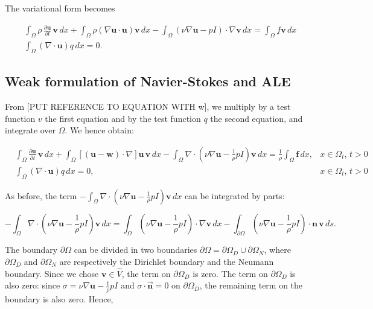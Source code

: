 \documentclass[11pt,a4paper,titlepage]{report}
\begin{document}
The variational form becomes

\begin{align}
& \int_{\Omega} \rho \, \frac{\partial \mathbf{u}}{\partial t} \, \mathbf{v} \, dx + \int_{\Omega} \rho (\nabla \mathbf{u} \cdot \mathbf{u})\mathbf{v} \, dx - \int_{\Omega} (\nu \nabla \mathbf{u} - pI) \cdot \nabla \mathbf{v} \, dx = \int_{\Omega} f\mathbf{v} \, dx \\
& \int_{\Omega} (\nabla \cdot \mathbf{u}) q \, dx = 0.
\end{align}


\subsection{Weak formulation of Navier-Stokes and ALE}


From [PUT REFERENCE TO EQUATION WITH w], we multiply by a test function $v$ the first equation and by the test function $q$ the second equation, and integrate over $\Omega$. We hence obtain:


\[
\begin{aligned}
& \int_{\Omega} \frac{\partial \mathbf{u}}{\partial t} \, \mathbf{v} \, dx 
+ \int_{\Omega} [(\mathbf{u - w}) \cdot \nabla] \mathbf{u} \, \mathbf{v} \, dx
- \int_{\Omega} \nabla \cdot (\nu \nabla \mathbf{u} -  \frac{1}{\rho}  pI)\mathbf{v} \, dx
=  \frac{1}{\rho} \int_{\Omega} \mathbf{f} \, dx,  & x \in \Omega_t, \, t>0 \\
& \int_{\Omega}  (\nabla \cdot \mathbf{u}) q \, dx = 0 , & x \in \Omega_t, \, t>0
\end{aligned}
\]


As before, the term $- \int_{\Omega} \nabla \cdot (\nu \nabla \mathbf{u} -   \frac{1}{\rho}  pI)\mathbf{v} \, dx$ can be integrated by parts:

\[
- \int_{\Omega} \nabla \cdot (\nu \nabla \mathbf{u} -  \frac{1}{\rho} pI)\mathbf{v} \, dx =  \int_{\Omega} (\nu \nabla \mathbf{u} -  \frac{1}{\rho}  pI) \cdot \nabla \mathbf{v} \, dx - \int_{\partial \Omega} (\nu \nabla \mathbf{u} -  \frac{1}{\rho}  pI) \cdot \mathbf{n} \, \mathbf{v} \, ds.
\]

The boundary $\partial \Omega$ can be divided in two boundaries $ \partial \Omega = \partial \Omega_D \cup \partial \Omega_N $, where $\partial \Omega_D$ and $\partial \Omega_N$ are respectively the Dirichlet boundary and the Neumann boundary. 
Since we chose $\mathbf{v} \in \hat{V}$, the term on $\partial \Omega_{D}$ is zero. The term on $\partial \Omega_{D}$ is also zero: since $\sigma = \nu \nabla \mathbf{u} -  \frac{1}{\rho} pI$ and $\sigma \cdot \vec{\mathbf{n}} = 0$ on $\partial \Omega_{D}$, the remaining term on the boundary is also zero. Hence,
\end{document}
